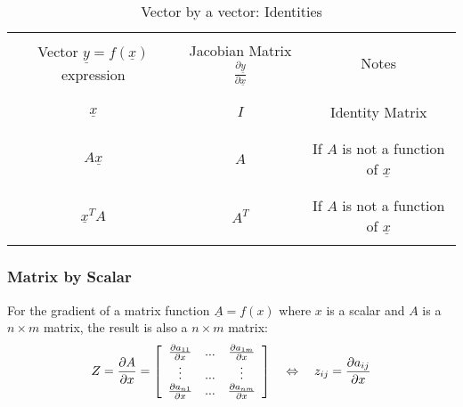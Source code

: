 \begin{table}[H]
\centering
\caption{ Vector by a vector: Identities}
\label{scavec}
 \begin{tabular}{ | c | c | c |}
 \hline \hline & & \\
 Vector $\underline{y} = f(\underline{x})$ expression &Jacobian Matrix $\frac{\partial \underline{y}}{\partial \underline{x}}$  & Notes \\ & & \\
 \hline \hline & & \\
 $ \underline{x} $ & 
 $I$ &   Identity Matrix
 \\ & & \\
 \hline & & \\
 $ A \underline{x} $ & 
 $A$ &   If $A$ is not a function of $\underline{x}$
 \\ & & \\
 \hline & & \\
 $ \underline{x}^T A $ & 
 $A^T$ &   If $A$ is not a function of $\underline{x}$
 \\ & & \\
 \hline
 \end{tabular}
\end{table}


\subsubsection{Matrix by Scalar}

For the gradient of a matrix function $\underline{A} = f(x)$ where $x$ is a scalar and $A$ is a $n \times m$ matrix, the result is also a $n \times m$ matrix:
\begin{align}
Z = \frac{\partial A}{\partial x} =  
\left[ \begin{array}{c c c } 
  \frac{\partial a_{11}}{\partial x}   & ... & \frac{\partial a_{1m}}{\partial x} \\
  \vdots                             & ... & \vdots                          \\
  \frac{\partial a_{n1}}{\partial x}   & ... & \frac{\partial a_{nm}}{\partial x} \\
 \end{array} \right]
 \quad\Leftrightarrow\quad
  z_{ij} = \frac{\partial a_{ij}}{\partial x}
\end{align}

